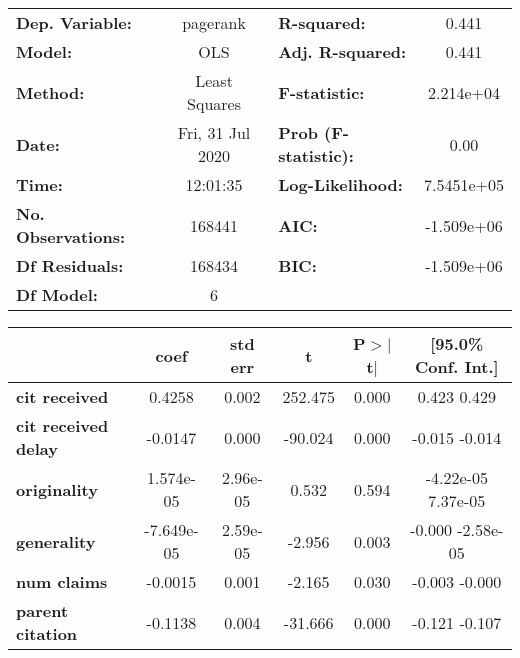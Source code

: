\begin{center}
\begin{tabular}{lclc}
\toprule
\textbf{Dep. Variable:}     &     pagerank     & \textbf{  R-squared:         } &        0.441     \\
\textbf{Model:}             &       OLS        & \textbf{  Adj. R-squared:    } &        0.441     \\
\textbf{Method:}            &  Least Squares   & \textbf{  F-statistic:       } &    2.214e+04     \\
\textbf{Date:}              & Fri, 31 Jul 2020 & \textbf{  Prob (F-statistic):} &        0.00      \\
\textbf{Time:}              &     12:01:35     & \textbf{  Log-Likelihood:    } &    7.5451e+05    \\
\textbf{No. Observations:}  &      168441      & \textbf{  AIC:               } &    -1.509e+06    \\
\textbf{Df Residuals:}      &      168434      & \textbf{  BIC:               } &    -1.509e+06    \\
\textbf{Df Model:}          &           6      & \textbf{                     } &                  \\
\bottomrule
\end{tabular}
\begin{tabular}{lccccc}
                            & \textbf{coef} & \textbf{std err} & \textbf{t} & \textbf{P$>$$|$t$|$} & \textbf{[95.0\% Conf. Int.]}  \\
\midrule
\textbf{cit received}       &       0.4258  &        0.002     &   252.475  &         0.000        &         0.423     0.429       \\
\textbf{cit received delay} &      -0.0147  &        0.000     &   -90.024  &         0.000        &        -0.015    -0.014       \\
\textbf{originality}        &    1.574e-05  &     2.96e-05     &     0.532  &         0.594        &     -4.22e-05  7.37e-05       \\
\textbf{generality}         &   -7.649e-05  &     2.59e-05     &    -2.956  &         0.003        &        -0.000 -2.58e-05       \\
\textbf{num claims}         &      -0.0015  &        0.001     &    -2.165  &         0.030        &        -0.003    -0.000       \\
\textbf{parent citation}    &      -0.1138  &        0.004     &   -31.666  &         0.000        &        -0.121    -0.107       \\

\end{tabular}
\end{center}
